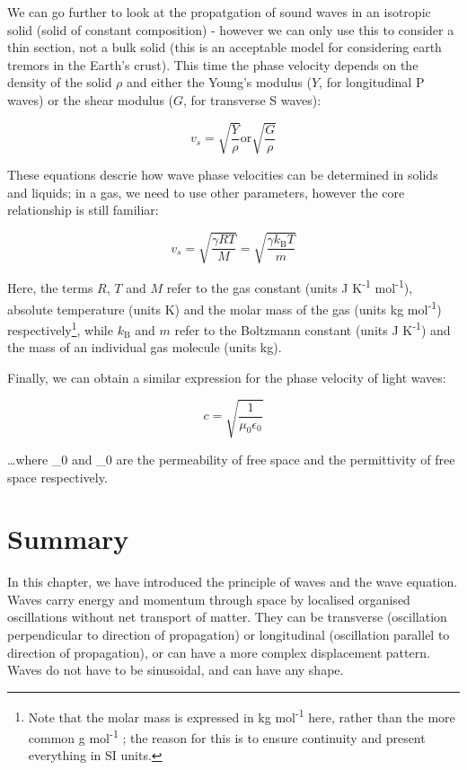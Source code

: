 \documentclass[
]{book}
\begin{document}
We can go further to look at the propatgation of sound waves in an isotropic solid (solid of constant composition) - however we can only use this to consider a thin section, not a bulk solid (this is an acceptable model for considering earth tremors in the Earth's crust). This time the phase velocity depends on the density of the solid \(\rho\) and either the Young's modulus (\(Y\), for longitudinal P waves) or the shear modulus (\(G\), for transverse S waves):

\begin{equation}
v_s = \sqrt{\frac{Y}{\rho}} \textrm{or} \sqrt{\frac{G}{\rho}}
\end{equation}

These equations descrie how wave phase velocities can be determined in solids and liquids; in a gas, we need to use other parameters, however the core relationship is still familiar:

\begin{equation}
v_s = \sqrt{\frac{\gamma RT}{M}} =  \sqrt{\frac{\gamma k_{\mathrm{B}}T}{m}}
\end{equation}

Here, the terms \(R\), \(T\) and \(M\) refer to the gas constant (units J K\textsuperscript{-1} mol\textsuperscript{-1}), absolute temperature (units K) and the molar mass of the gas (units kg mol\textsuperscript{-1}) respectively\footnote{Note that the molar mass is expressed in kg mol\textsuperscript{-1} here, rather than the more common g mol\textsuperscript{-1} ; the reason for this is to ensure continuity and present everything in SI units.}, while \(k_{\textrm{B}}\) and \(m\) refer to the Boltzmann constant (units J K\textsuperscript{-1}) and the mass of an individual gas molecule (units kg).

Finally, we can obtain a similar expression for the phase velocity of light waves:

\begin{equation}
c = \sqrt{\frac{1}{\mu_0 \epsilon_0}}
\end{equation}

\ldots where \mu\_0 and \epsilon\_0 are the permeability of free space and the permittivity of free space respectively.

\hypertarget{sec:ch6-summary}{%
\section{Summary}\label{sec:ch6-summary}}

In this chapter, we have introduced the principle of waves and the wave equation. Waves carry energy and momentum through space by localised organised oscillations without net transport of matter. They can be transverse (oscillation perpendicular to direction of propagation) or longitudinal (oscillation parallel to direction of propagation), or can have a more complex displacement pattern. Waves do not have to be sinusoidal, and can have any shape.
\end{document}
